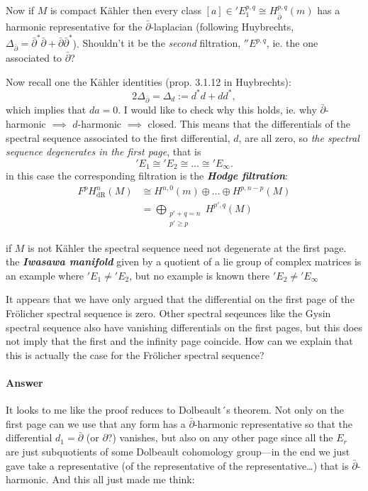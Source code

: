 \begin{remark}
\begin{defn}
Now if $M$ is compact K\"ahler then every class $[a]\in 'E^{p,q}_1\cong H^{p,q}_{\bar\partial}(m)$ has a harmonic representative for the $\bar\partial$-laplacian (following Huybrechts, $\Delta_{\bar\partial}=\bar\partial^*\bar\partial+\bar\partial\bar\partial^*$). {\color{blue}Shouldn't it be the \textit{second} filtration, $''E^{p,q}$, ie. the one associated to $\bar\partial$?}

Now recall one the K\"ahler identities (prop. 3.1.12 in Huybrechts):
\[2\Delta_{\bar\partial}=\Delta_d:=d^*d+dd^*,\]
which {\color{blue}implies} that $da=0$. {\color{blue}I would like to check why this holds, ie. why $\bar\partial$-harmonic $\implies$ $d$-harmonic $\implies$ closed}. This means that the differentials of the spectral sequence associated to the first differential, $d$, are all zero, so \textit{the spectral sequence degenerates in the first page}, that is
\['E_1\cong 'E_2\cong \ldots\cong 'E_\infty.\]
in this case the corresponding filtration is the \textit{\textbf{Hodge filtration}}:
\begin{align*}
	F^pH^{n}_{\operatorname{dR}}(M)&\cong H^{n,0}(m)\oplus\ldots\oplus H^{p,n-p}(M)\\
				       &=\bigoplus_{\substack{p'+q=n \\ p'\geq p}}  H^{p',q}(M)
\end{align*}
\begin{remark}
	if $M$ is not K\"ahler the spectral sequence need not degenerate at the first page. the \textit{\textbf{Iwasawa manifold}} given by a quotient of a lie group of complex matrices is an example where $'E_1\neq 'E_2$, but no example is known there ${'E_2\neq 'E_\infty}$
\end{remark}

\begin{question}[Altan]
	It appears that we have only argued that the differential on the first page of the Fr\"olicher spectral sequence is zero. Other spectral seqeunces like the Gysin spectral sequence also have vanishing differentials on the first pages, but this does not imply that the first and the infinity page coincide. How can we explain that this is actually the case for the Fr\"olicher spectral sequence?
\end{question}

\paragraph{Answer}It looks to me like the proof reduces to Dolbeault´s theorem. Not only on the first page can we use that any form has a $\bar\partial$-harmonic representative so that the differential $d_1=\bar\partial$ (or $\partial$?) vanishes, but also on any other page since all the $E_{r}$ are just subquotients of some Dolbeault cohomology group---in the end we just gave take a representative (of the representative of the representative…) that is $\bar\partial$-harmonic. And this all just made me think:


\end{defn}
\end{remark}
